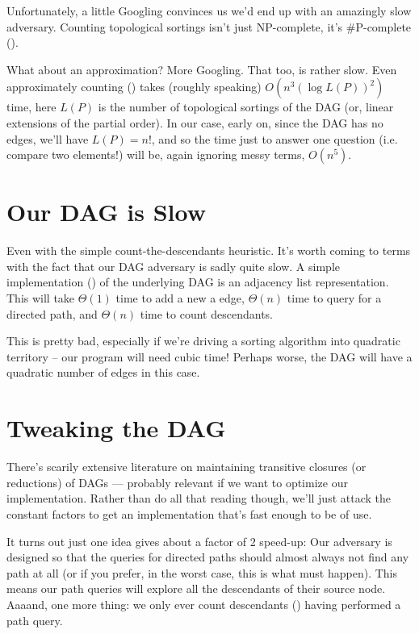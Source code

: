 \documentclass[11pt]{article}
\begin{document}
Unfortunately, a little Googling convinces us we'd end up with an amazingly slow adversary. Counting topological sortings isn't just NP-complete, it's \#P-complete (\texttt{}).

What about an approximation? More Googling.  That too, is rather slow. Even approximately counting (\texttt{}) takes (roughly speaking) $O(n^3 (\log L(P))^2)$ time, here $L(P)$ is the number of topological sortings of the DAG (or, linear extensions of the partial order). In our case, early on, since the DAG has no edges, we'll have $L(P) = n!$, and so the time just to answer one question (i.e. compare two elements!) will be, again ignoring messy terms, $O(n^5)$.
\section{Our DAG is Slow}

Even with the simple count-the-descendants heuristic. It's worth coming to terms with the fact that our DAG adversary is sadly quite slow. A simple implementation (\texttt{}) of the underlying DAG is an adjacency list representation. This will take $\Theta(1)$ time to add a new a edge, $\Theta(n)$ time to query for a directed path, and $\Theta(n)$ time to count descendants.

This is pretty bad, especially if we're driving a sorting algorithm into quadratic territory -- our program will need cubic time! Perhaps worse, the DAG will have a quadratic number of edges in this case.
\section{Tweaking the DAG}

There's scarily extensive literature on maintaining transitive closures (or reductions) of DAGs --- probably relevant if we want to optimize our implementation. Rather than do all that reading though, we'll just attack the constant factors to get an implementation that's fast enough to be of use.

It turns out just one idea gives about a factor of 2 speed-up: Our adversary is designed so that the queries for directed paths should almost always not find any path at all (or if you prefer, in the worst case, this is what must happen). This means our path queries will explore all the descendants of their source node. Aaaand, one more thing: we only ever count descendants (\texttt{}) having performed a path query.
\end{document}
